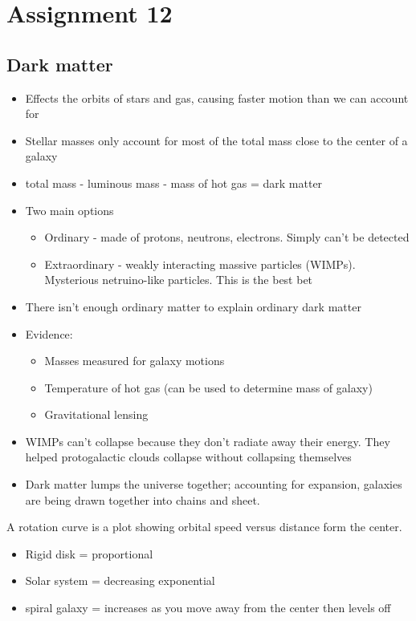 \section{Assignment 12}
\subsection{Dark matter}
\begin{itemize}
\item Effects the orbits of stars and gas, causing faster motion than we can account for
\item Stellar masses only account for most of the total mass close to the center of a galaxy
\item total mass - luminous mass - mass of hot gas = dark matter
\item Two main options
\begin{itemize}
\item Ordinary - made of protons, neutrons, electrons.  Simply can't be detected
\item Extraordinary - weakly interacting massive particles (WIMPs).  Mysterious netruino-like particles.  This is the best bet
\end{itemize}
\item There isn't enough ordinary matter to explain ordinary dark matter
\item Evidence:
\begin{itemize}
\item Masses measured for galaxy motions
\item Temperature of hot gas (can be used to determine mass of galaxy)
\item Gravitational lensing
\end{itemize}
\item WIMPs can't collapse because they don't radiate away their energy.  They helped protogalactic clouds collapse without collapsing themselves
\item Dark matter lumps the universe together; accounting for expansion, galaxies are being drawn together into chains and sheet.
\end{itemize}

A rotation curve is a plot showing orbital speed versus distance form the center.
\begin{itemize}
\item Rigid disk = proportional
\item Solar system = decreasing exponential
\item spiral galaxy = increases as you move away from the center then levels off
\end{itemize}

